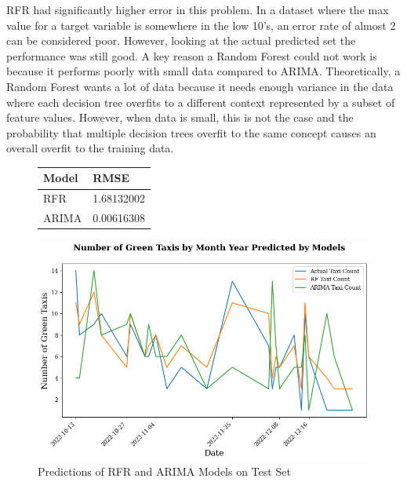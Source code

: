 \documentclass[11pt]{article}
\begin{document}
RFR had significantly higher error in this problem. In a dataset where the max value for a target variable is somewhere in the low 10's, an error rate of almost 2 can be considered poor. However, looking at the actual predicted set the performance was still good. A key reason a Random Forest could not work is because it performs poorly with small data compared to ARIMA. Theoretically, a Random Forest wants a lot of data because it needs enough variance in the data where each decision tree overfits to a different context represented by a subset of feature values. However, when data is small, this is not the case and the probability that multiple decision trees overfit to the same concept causes an overall overfit to the training data.

\begin{figure}[ht]
    \begin{minipage}{0.5\linewidth}
        \centering
        \begin{tabular}{|l|l|}
            \hline
            Model & RMSE \\
            \hline\hline
            RFR & 1.68132002 \\
            ARIMA & 0.00616308 \\
            \hline
        \end{tabular}
        \label{table4}
    \end{minipage}%
    \begin{minipage}{0.5\linewidth}
        \centering
        \includegraphics[width=\linewidth]{plots/green_daily_predictions.png}
        \caption{Predictions of RFR and ARIMA Models on Test Set}
        \label{fig:predictions}
    \end{minipage}
\end{figure}
\end{document}
